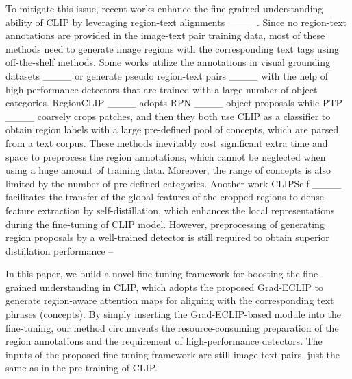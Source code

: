 To mitigate this issue, recent works enhance the fine-grained understanding ability of CLIP by leveraging  region-text alignments  
____.
Since no region-text  annotations are provided in the image-text pair training data, most of these methods need to generate image regions with the corresponding text tags using off-the-shelf methods. Some works utilize the annotations in visual grounding datasets ____ or generate pseudo region-text pairs ____ with the help of high-performance detectors that are trained with a large number of object categories. 
RegionCLIP ____ adopts RPN ____ object proposals while PTP ____ coarsely crops patches, and then they both use CLIP as a classifier to obtain region labels with a large pre-defined pool of concepts, which are parsed from a text corpus.
These methods inevitably cost significant extra time and space to preprocess the region annotations, which cannot be neglected when using a huge amount of training data. Moreover, the range of concepts is also limited by the number of pre-defined categories. 
Another work CLIPSelf ____ facilitates the transfer of the global features of the cropped regions to dense feature extraction by self-distillation, which enhances the local representations during the fine-tuning of CLIP model. However, preprocessing of generating region proposals by a well-trained detector is still required to obtain superior distillation performance -- 

In this paper, we build a novel fine-tuning framework for boosting the fine-grained understanding in CLIP, which adopts the proposed Grad-ECLIP to generate  region-aware attention maps for aligning with the corresponding text phrases (concepts). By simply inserting the Grad-ECLIP-based module into the fine-tuning, our method circumvents the resource-consuming preparation of the region annotations and the requirement of high-performance detectors.
The inputs of the proposed fine-tuning framework are still image-text pairs, just the same as in the pre-training of CLIP.  




